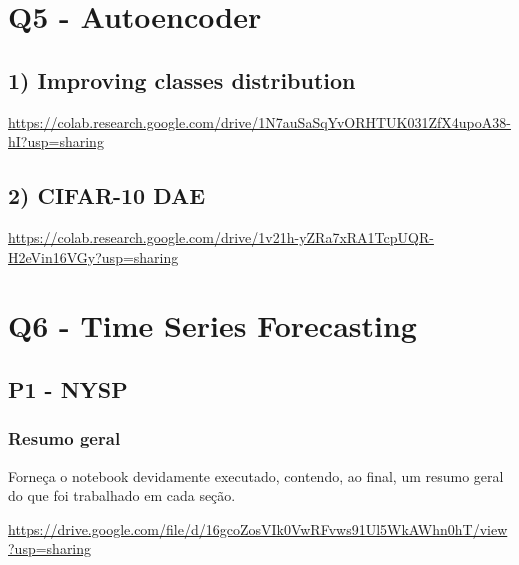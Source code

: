 \documentclass[a4paper]{article}    %
\begin{document}
\section{Q5 - Autoencoder}

\subsection{1) Improving classes distribution}

\href{https://colab.research.google.com/drive/1N7auSaSqYvORHTUK031ZfX4upoA38-hI?usp=sharing}{https://colab.research.google.com/drive/1N7auSaSqYvORHTUK031ZfX4upoA38-hI?usp=sharing}

\subsection{2) CIFAR-10 DAE}

\href{https://colab.research.google.com/drive/1v21h-yZRa7xRA1TcpUQR-H2eVin16VGy?usp=sharing}{https://colab.research.google.com/drive/1v21h-yZRa7xRA1TcpUQR-H2eVin16VGy?usp=sharing}

\section{Q6 - Time Series Forecasting}

\subsection{P1 - NYSP}

\subsubsection{Resumo geral}
Forneça o notebook devidamente executado, contendo, ao final, um resumo geral do que foi trabalhado em cada seção.

\href{https://drive.google.com/file/d/16gcoZosVIk0VwRFvws91Ul5WkAWhn0hT/view?usp=sharing}{https://drive.google.com/file/d/16gcoZosVIk0VwRFvws91Ul5WkAWhn0hT/view?usp=sharing}
\end{document}

